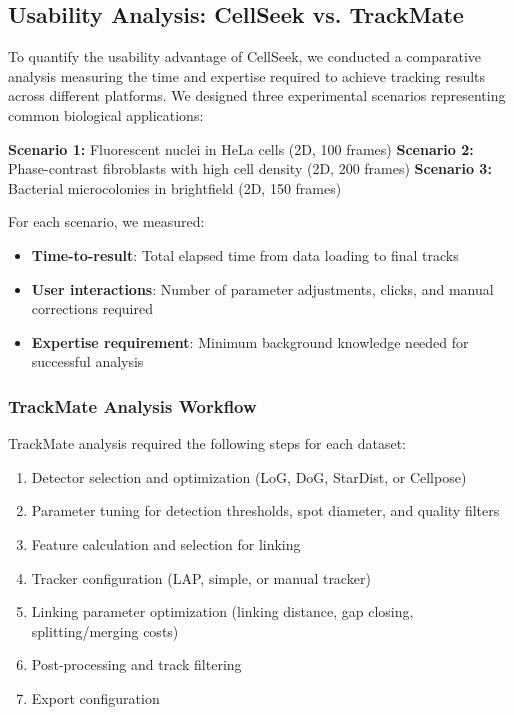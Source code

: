 \documentclass[12pt]{article}
\begin{document}
\subsection{Usability Analysis: CellSeek vs. TrackMate}

To quantify the usability advantage of CellSeek, we conducted a comparative analysis measuring the time and expertise required to achieve tracking results across different platforms. We designed three experimental scenarios representing common biological applications:

\textbf{Scenario 1:} Fluorescent nuclei in HeLa cells (2D, 100 frames)
\textbf{Scenario 2:} Phase-contrast fibroblasts with high cell density (2D, 200 frames)
\textbf{Scenario 3:} Bacterial microcolonies in brightfield (2D, 150 frames)

For each scenario, we measured:
\begin{itemize}
  \item \textbf{Time-to-result}: Total elapsed time from data loading to final tracks
  \item \textbf{User interactions}: Number of parameter adjustments, clicks, and manual corrections required
  \item \textbf{Expertise requirement}: Minimum background knowledge needed for successful analysis
\end{itemize}

\subsubsection{TrackMate Analysis Workflow}

TrackMate analysis required the following steps for each dataset:
\begin{enumerate}
  \item Detector selection and optimization (LoG, DoG, StarDist, or Cellpose)
  \item Parameter tuning for detection thresholds, spot diameter, and quality filters
  \item Feature calculation and selection for linking
  \item Tracker configuration (LAP, simple, or manual tracker)
  \item Linking parameter optimization (linking distance, gap closing, splitting/merging costs)
  \item Post-processing and track filtering
  \item Export configuration
\end{enumerate}
\end{document}
